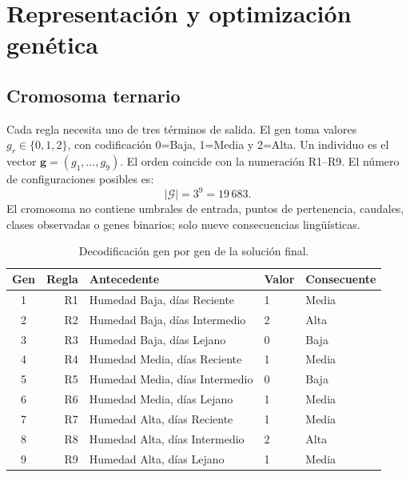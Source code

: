 \documentclass[11pt,letterpaper]{article}
\begin{document}
\section{Representación y optimización genética}
\subsection{Cromosoma ternario}
Cada regla necesita uno de tres términos de salida. El gen toma valores $g_r\in\{0,1,2\}$, con codificación 0=Baja, 1=Media y 2=Alta. Un individuo es el vector $\mathbf{g}=(g_1,\ldots,g_9)$. El orden coincide con la numeración R1--R9. El número de configuraciones posibles es:
\begin{equation}
  |\mathcal{G}|=3^9=19\,683.
\end{equation}
El cromosoma no contiene umbrales de entrada, puntos de pertenencia, caudales, clases observadas o genes binarios; solo nueve consecuencias lingüísticas.

\begin{table}[H]
\centering\small
\caption{Decodificación gen por gen de la solución final.}\label{tab:decodificacion-ga}
\begin{tabular}{crlll}
\toprule
Gen & Regla & Antecedente & Valor & Consecuente\\
\midrule
1 & R1 & Humedad Baja, días Reciente & 1 & Media\\
2 & R2 & Humedad Baja, días Intermedio & 2 & Alta\\
3 & R3 & Humedad Baja, días Lejano & 0 & Baja\\
4 & R4 & Humedad Media, días Reciente & 1 & Media\\
5 & R5 & Humedad Media, días Intermedio & 0 & Baja\\
6 & R6 & Humedad Media, días Lejano & 1 & Media\\
7 & R7 & Humedad Alta, días Reciente & 1 & Media\\
8 & R8 & Humedad Alta, días Intermedio & 2 & Alta\\
9 & R9 & Humedad Alta, días Lejano & 1 & Media\\
\bottomrule
\end{tabular}
\end{table}
\end{document}
